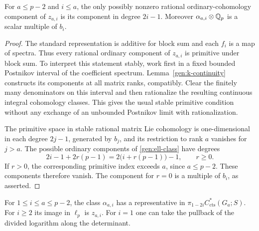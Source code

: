 \begin{lemma}
\label{gen:rational-components}
For $a\leq p-2$ and $i\leq a$, the only possibly nonzero rational
ordinary-cohomology component of $z_{a,i}$ is its component in degree
$2i-1$.  Moreover $\alpha_{a,i}\otimes\mathbb Q_p$ is a scalar multiple of
$b_i$.
\end{lemma}

\begin{proof}
The standard representation is additive for block sum and each $f_i$
is a map of spectra.  Thus every rational ordinary component of
$z_{a,i}$ is primitive under block sum.  To interpret this statement
stably, work first in a fixed bounded Postnikov interval of the
coefficient spectrum.  Lemma~\ref{gen:k-continuity} constructs its
components at all matrix ranks, compatibly.  Clear the finitely many
denominators on this interval and then rationalize the resulting
continuous integral cohomology classes.  This gives the usual stable
primitive condition without any exchange of an unbounded Postnikov
limit with rationalization.

The primitive space in stable rational matrix Lie cohomology is
one-dimensional in each degree $2j-1$, generated by $b_j$, and its
restriction to rank $a$ vanishes for $j>a$.  The possible ordinary
components of \eqref{gen:ell-class} have degrees
\[
 2i-1+2r(p-1)=2\bigl(i+r(p-1)\bigr)-1,
 \qquad r\geq0.
\]
If $r>0$, the corresponding primitive index exceeds $a$, since
$a\leq p-2$.  These components therefore vanish.  The component for
$r=0$ is a multiple of $b_i$, as asserted.
\end{proof}

\begin{lemma}\label{gen:sphere-representatives}
For $1\leq i\leq a\leq p-2$, the class $\alpha_{a,i}$ has a
representative in
$\pi_{1-2i}C^*_{\mathrm{cts}}(G_a;S)$.
For $i\geq2$ its image in $\ell_p$ is $z_{a,i}$.
For $i=1$ one can take the pullback of the divided logarithm along
the determinant.
\end{lemma}


